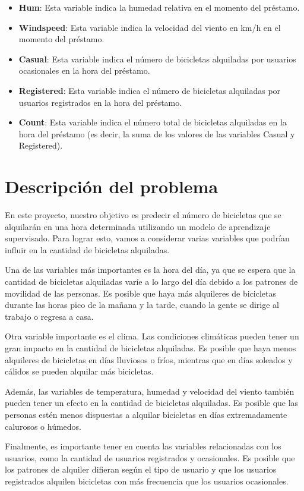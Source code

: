 \documentclass{wsdcr}
\begin{document}
\begin{itemize}
    \item \textbf{Hum}: Esta variable indica la humedad relativa en el momento del préstamo.
    \item \textbf{Windspeed}: Esta variable indica la velocidad del viento en km/h en el momento del préstamo.
    \item \textbf{Casual}: Esta variable indica el número de bicicletas alquiladas por usuarios ocasionales en la hora del préstamo.
    \item \textbf{Registered}: Esta variable indica el número de bicicletas alquiladas por usuarios registrados en la hora del préstamo.
    \item \textbf{Count}: Esta variable indica el número total de bicicletas alquiladas en la hora del préstamo (es decir, la suma de los valores de las variables Casual y Registered).
\end{itemize}

\section{Descripción del problema}
En este proyecto, nuestro objetivo es predecir el número de bicicletas que se alquilarán en una hora determinada utilizando un modelo de aprendizaje supervisado. Para lograr esto, vamos a considerar varias variables que podrían influir en la cantidad de bicicletas alquiladas.

Una de las variables más importantes es la hora del día, ya que se espera que la cantidad de bicicletas alquiladas varíe a lo largo del día debido a los patrones de movilidad de las personas. Es posible que haya más alquileres de bicicletas durante las horas pico de la mañana y la tarde, cuando la gente se dirige al trabajo o regresa a casa.

Otra variable importante es el clima. Las condiciones climáticas pueden tener un gran impacto en la cantidad de bicicletas alquiladas. Es posible que haya menos alquileres de bicicletas en días lluviosos o fríos, mientras que en días soleados y cálidos se pueden alquilar más bicicletas.

Además, las variables de temperatura, humedad y velocidad del viento también pueden tener un efecto en la cantidad de bicicletas alquiladas. Es posible que las personas estén menos dispuestas a alquilar bicicletas en días extremadamente calurosos o húmedos.

Finalmente, es importante tener en cuenta las variables relacionadas con los usuarios, como la cantidad de usuarios registrados y ocasionales. Es posible que los patrones de alquiler difieran según el tipo de usuario y que los usuarios registrados alquilen bicicletas con más frecuencia que los usuarios ocasionales.
\end{document}
